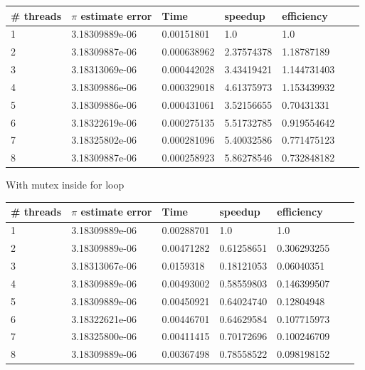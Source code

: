 \documentclass[11pt,epsfig,letterpaper]{article}
\begin{document}
\begin{enumerate}
\begin{center}
            \begin{tabular}{ | l | l | l | l | l | l | p{10cm} |}
            \hline
            \# threads & $\pi$ estimate error & Time & speedup & efficiency \\ \hline
            1 &   3.18309889e-06 & 0.00151801     & 1.0        & 1.0       \\ \hline
            2 &   3.18309887e-06 & 0.000638962   &  2.37574378 &1.18787189  \\ \hline
            3 &   3.18313069e-06 & 0.000442028   &  3.43419421 &1.144731403  \\ \hline
            4 &   3.18309886e-06 & 0.000329018   &  4.61375973 &1.153439932  \\ \hline
            5 &   3.18309886e-06 & 0.000431061   &  3.52156655 &0.70431331   \\ \hline
            6 &   3.18322619e-06 & 0.000275135    & 5.51732785 &0.919554642  \\ \hline
            7 &   3.18325802e-06   & 0.000281096 &  5.40032586 &0.771475123  \\ \hline
            8 &   3.18309887e-06  & 0.000258923  &  5.86278546 &0.732848182  \\ \hline
            \end{tabular}
            \vspace{0.5pc}

              \pagebreak
            With mutex inside for loop

            \begin{tabular}{ | l | l | l | l | l | l | p{10cm} |}
            \hline
            \# threads & $\pi$ estimate error & Time & speedup & efficiency \\ \hline
            1 & 3.18309889e-06 &  0.00288701& 1.0        & 1.0 \\ \hline
            2 & 3.18309889e-06  & 0.00471282& 0.61258651 &0.306293255 \\ \hline
            3 & 3.18313067e-06  & 0.0159318 & 0.18121053 &0.06040351   \\ \hline
            4 & 3.18309889e-06  & 0.00493002& 0.58559803 &0.146399507  \\ \hline
            5 & 3.18309889e-06  & 0.00450921& 0.64024740 &0.12804948   \\ \hline
            6 & 3.18322621e-06 &  0.00446701& 0.64629584 &0.107715973  \\ \hline
            7 & 3.18325800e-06  & 0.00411415& 0.70172696 &0.100246709  \\ \hline
            8 & 3.18309889e-06  & 0.00367498& 0.78558522 &0.098198152  \\ \hline
            \end{tabular}
            \vspace{0.5pc}


\end{center}
\end{enumerate}
\end{document}
